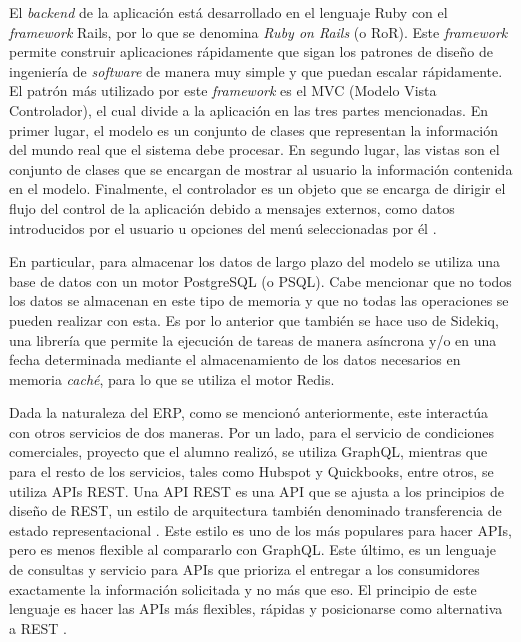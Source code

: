     El \textit{backend} de la aplicación está desarrollado en el lenguaje Ruby con el \textit{framework} Rails, por lo que se denomina \textit{Ruby on Rails} (o RoR). Este \textit{framework} permite construir aplicaciones rápidamente que sigan los patrones de diseño de ingeniería de \textit{software} de manera muy simple y que puedan escalar rápidamente. El patrón más utilizado por este \textit{framework} es el MVC (Modelo Vista Controlador), el cual divide a la aplicación en las tres partes mencionadas. En primer lugar, el modelo es un conjunto de clases que representan la información del mundo real que el sistema debe procesar. En segundo lugar, las vistas son el conjunto de clases que se encargan de mostrar al usuario la información contenida en el modelo. Finalmente, el controlador es un objeto que se encarga de dirigir el flujo del control de la aplicación debido a mensajes externos, como datos introducidos por el usuario u opciones del menú seleccionadas por él \cite{mvc_architecture}.
   
   En particular, para almacenar los datos de largo plazo del modelo se utiliza una base de datos con un motor PostgreSQL (o PSQL). Cabe mencionar que no todos los datos se almacenan en este tipo de memoria y que no todas las operaciones se pueden realizar con esta. Es por lo anterior que también se hace uso de Sidekiq, una librería que permite la ejecución de tareas de manera asíncrona y/o en una fecha determinada mediante el almacenamiento de los datos necesarios en memoria \textit{caché}, para lo que se utiliza el motor Redis.
   
   Dada la naturaleza del ERP, como se mencionó anteriormente, este interactúa con otros servicios de dos maneras. Por un lado, para el servicio de condiciones comerciales, proyecto que el alumno realizó, se utiliza GraphQL, mientras que para el resto de los servicios, tales como Hubspot y Quickbooks, entre otros, se utiliza APIs REST. Una API REST es una API que se ajusta a los principios de diseño de REST, un estilo de arquitectura también denominado transferencia de estado representacional \cite{ibm_api_rest}. Este estilo es uno de los más populares para hacer APIs, pero es menos flexible al compararlo con GraphQL. Este último, es un lenguaje de consultas y servicio para APIs que prioriza el entregar a los consumidores exactamente la información solicitada y no más que eso. El principio de este lenguaje es hacer las APIs más flexibles, rápidas y posicionarse como alternativa a REST \cite{def_graphql}.
   
